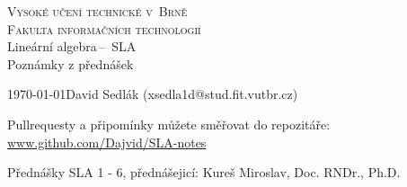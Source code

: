 \documentclass[a4paper, 11pt]{article}
\theoremstyle{break}
\begin{document}
\begin{titlepage}

	\begin{center}
		\textsc{\Huge Vysoké učení technické v~Brně}\\
				  \huge{\textsc{Fakulta informačních technologií}}\\
		{\LARGE 	Lineární algebra\,--\, SLA}\\
				{\Huge Poznámky z přednášek}
	\end{center}
	{\Large\today \hfill David Sedlák (xsedla1d@stud.fit.vutbr.cz)}

	\begin{center}
		Pullrequesty a připomínky můžete směřovat do repozitáře: \url{www.github.com/Dajvid/SLA-notes}
	\end{center}
\end{titlepage}

\tableofcontents








\newpage


\def\refname{Reference}
Přednášky SLA 1 - 6, přednášejicí: Kureš Miroslav, Doc. RNDr., Ph.D.
\end{document}
